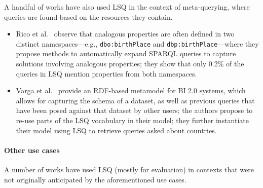 A handful of works have also used LSQ in the context of meta-querying, where queries are found based on the resources they contain. 

\begin{itemize}
\item Rico et al.~\cite{rico2016data} observe that analogous \dbpedia properties are often defined in two distinct namespaces---e.g., \texttt{dbo:birthPlace} and \texttt{dbp:birthPlace}---where they propose methods to automatically expand SPARQL queries to capture solutions involving analogous properties; they show that only 0.2\% of the \dbpedia queries in LSQ mention properties from both namespaces.
\item Varga et al.~\cite{varga2018analytical} provide an RDF-based metamodel for BI 2.0 systems, which allows for capturing the schema of a dataset, as well as previous queries that have been posed against that dataset by other users; the authors propose to re-use parts of the LSQ vocabulary in their model; they further instantiate their model using LSQ to retrieve queries asked about countries.
\end{itemize} 

\paragraph{Other use cases} A number of works have used LSQ (mostly for evaluation) in contexts that were not originally anticipated by the aforementioned use cases.

